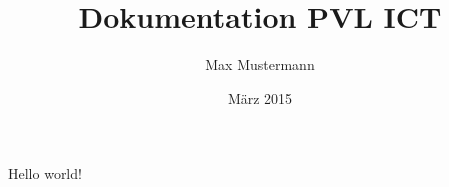 \documentclass{article}
\title{Dokumentation PVL ICT}
\author{Max Mustermann}
\date{M{\"a}rz 2015}
\begin{document}
   \maketitle
   Hello world!
\end{document}
